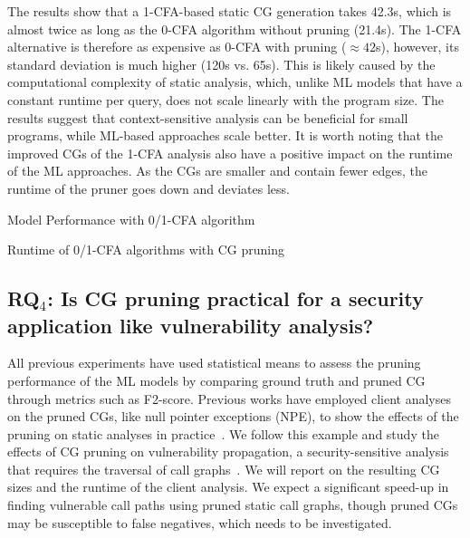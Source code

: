 The results show that a 1-CFA-based static CG generation takes 42.3s, which is almost twice as long as the 0-CFA algorithm without pruning (21.4s).
The 1-CFA alternative is therefore as expensive as 0-CFA with pruning ($\approx 42$s), however, its standard deviation is much higher (120s vs. 65s).
This is likely caused by the computational complexity of static analysis, which, unlike ML models that have a constant runtime per query, does not scale linearly with the program size.
The results suggest that context-sensitive analysis can be beneficial for small programs, while ML-based approaches scale better.
It is worth noting that the improved CGs of the 1-CFA analysis also have a positive impact on the runtime of the ML approaches.
As the CGs are smaller and contain fewer edges, the runtime of the pruner goes down and deviates less.

\begin{table}[t]
\centering
\caption{Model Performance with 0/1-CFA algorithm}
\label{ch1:tab:0-1cfa-perf}

\end{table}

\begin{table}[t]
\centering
\caption{Runtime of 0/1-CFA algorithms with CG pruning}
\label{ch1:tab:run-time-0-1-cfa}

\end{table}

\subsection{\textbf{RQ}$_{4}$: Is CG pruning practical for a security application like vulnerability analysis?}

All previous experiments have used statistical means to assess the pruning performance of the ML models by comparing ground truth and pruned CG through metrics such as F2-score.
Previous works have employed client analyses on the pruned CGs, like null pointer exceptions (NPE), to show the effects of the pruning on static analyses in practice~\cite{utture2022striking, le2022autopruner}.
We follow this example and study the effects of CG pruning on vulnerability propagation, a security-sensitive analysis that requires the traversal of call graphs~\cite{mir2023effect}.
We will report on the resulting CG sizes and the runtime of the client analysis.
We expect a significant speed-up in finding vulnerable call paths using pruned static call graphs, though pruned CGs may be susceptible to false negatives, which needs to be investigated.

